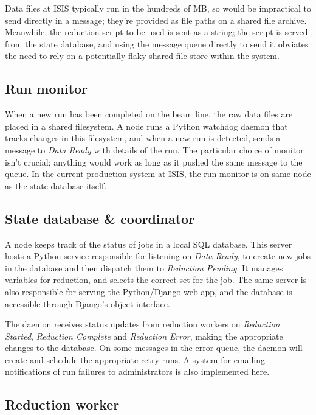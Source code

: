 \documentclass[twocolumn]{article}
\begin{document}
Data files at ISIS typically run in the hundreds of MB, so would be
impractical to send directly in a message; they're provided as file
paths on a shared file archive. Meanwhile, the reduction script to be
used is sent as a string; the script is served from the state database,
and using the message queue directly to send it obviates the need to
rely on a potentially flaky shared file store within the system.

\subsection{Run monitor}\label{run-monitor}

When a new run has been completed on the beam line, the raw data files are
placed in a shared filesystem. A node runs a Python watchdog daemon that
tracks changes in this filesystem, and when a new run is detected, sends a
message to \emph{Data Ready} with details of the run. The particular
choice of monitor isn't crucial; anything would work as long as it
pushed the same message to the queue. In the current production system
at ISIS, the run monitor is on same node as the state database itself.

\subsection{State database \& coordinator}\label{state-database}

A node keeps track of the status of jobs in a local SQL database. This
server hosts a Python service responsible for listening on \emph{Data
Ready}, to create new jobs in the database and then dispatch them to \emph{Reduction
Pending}. It manages variables for reduction, and selects the correct
set for the job. The same server is also responsible for serving the
Python/Django\cite{django} web app, and the database is accessible through
Django's object interface.

The daemon receives status updates from reduction workers on
\emph{Reduction Started}, \emph{Reduction Complete} and \emph{Reduction
Error}, making the appropriate changes to the database. On some messages
in the error queue, the daemon will create and schedule the appropriate
retry runs. A system for emailing notifications of run failures to
administrators is also implemented here.

\subsection{Reduction worker}\label{reduction-worker}
\end{document}
